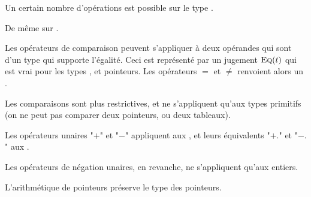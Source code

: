 Un certain nombre d'opérations est possible sur le type \tInt.

\begin{mathpar}
\end{mathpar}

De même sur \tFloat.

\begin{mathpar}
\end{mathpar}

Les opérateurs de comparaison peuvent s'appliquer à deux opérandes qui sont d'un
type qui supporte l'égalité. Ceci est représenté par un jugement
$\textsc{Eq}(t)$ qui est vrai pour les types \tInt, \tFloat et pointeurs. Les
opérateurs $=$ et $≠$ renvoient alors un \tInt.

\begin{mathpar}



\end{mathpar}


Les comparaisons sont plus restrictives, et ne s'appliquent qu'aux types
primitifs (on ne peut pas comparer deux pointeurs, ou deux tableaux).

\begin{mathpar}
\end{mathpar}


Les opérateurs unaires "$+$" et "$-$" appliquent aux \tInt, et leurs équivalents
"$+.$" et "$-.$" aux \tFloat.


Les opérateurs de négation unaires, en revanche, ne s'appliquent qu'aux
entiers.

\begin{mathpar}
\end{mathpar}

L'arithmétique de pointeurs préserve le type des pointeurs.

\begin{mathpar}
\end{mathpar}

